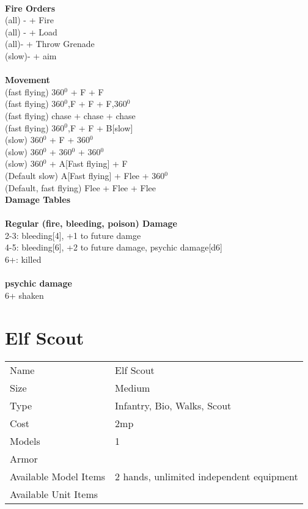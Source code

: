\ \\ {\bf Fire Orders } \\
(all) - + Fire \\
(all) - + Load \\
(all)- + Throw Grenade \\
(slow)- + aim \\
\ \\ {\bf Movement } \\
(fast flying) 360$^0$ + F + F \\
(fast flying) 360$^0$,F + F + F,360$^0$ \\
(fast flying) chase + chase + chase \\
(fast flying) 360$^0$,F + F + B[slow] \\
(slow) 360$^0$ + F + 360$^0$ \\
(slow) 360$^0$ + 360$^0$ + 360$^0$ \\
(slow) 360$^0$ + A[Fast flying] + F \\
(Default slow) A[Fast flying] + Flee + 360$^0$  \\
(Default, fast flying) Flee + Flee + Flee \\



{\bf Damage Tables} \\
\ \\ {\bf Regular (fire, bleeding, poison) Damage } \\
2-3: bleeding[4], +1 to future damge \\
4-5: bleeding[6], +2 to future damage, psychic damage[d6] \\
6+: killed \\
\ \\ {\bf psychic damage } \\
6+ shaken \\









\pagebreak

\section{ Elf Scout }

\begin{tabular}{ll}
  Name & Elf Scout \\
  Size & Medium\\
  Type & Infantry, Bio, Walks, Scout\\
  Cost & 2mp\\
  Models & 1\\
  Armor & \\
  Available Model Items & 2 hands, unlimited independent equipment \\
  Available Unit Items &  \\
\end{tabular}

